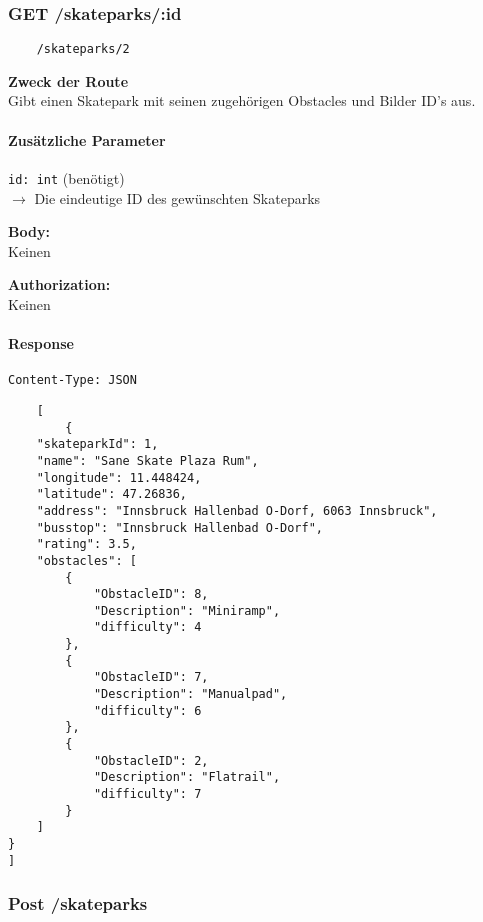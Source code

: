 \pagebreak

\subsubsection{GET /skateparks/:id}

\begin{lstlisting}
    /skateparks/2
\end{lstlisting}

\textbf{Zweck der Route} \\
Gibt einen Skatepark mit seinen zugehörigen Obstacles und Bilder ID's aus.




\paragraph{Zusätzliche Parameter}
\lstinline{id: int} (benötigt) \\
$\rightarrow$ Die eindeutige ID des gewünschten Skateparks


\textbf{Body:} \\
Keinen

\textbf{Authorization:} \\
Keinen

\paragraph{Response }

\lstinline{Content-Type: JSON}
\begin{lstlisting}
    [
        {
    "skateparkId": 1,
    "name": "Sane Skate Plaza Rum",
    "longitude": 11.448424,
    "latitude": 47.26836,
    "address": "Innsbruck Hallenbad O-Dorf, 6063 Innsbruck",
    "busstop": "Innsbruck Hallenbad O-Dorf",
    "rating": 3.5,
    "obstacles": [
        {
            "ObstacleID": 8,
            "Description": "Miniramp",
            "difficulty": 4
        },
        {
            "ObstacleID": 7,
            "Description": "Manualpad",
            "difficulty": 6
        },
        {
            "ObstacleID": 2,
            "Description": "Flatrail",
            "difficulty": 7
        }
    ]
}
]
\end{lstlisting}

\pagebreak


\subsubsection{Post /skateparks}

